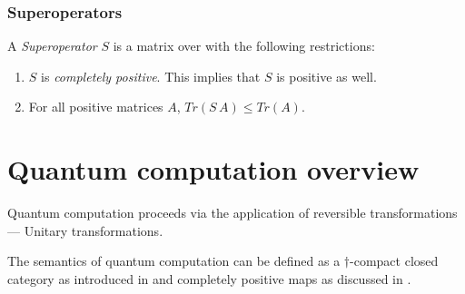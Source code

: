 
\subsubsection{Superoperators} %
\label{ssub:superoperators}

A \emph{Superoperator} $S$ is a matrix over \complex{} with the following restrictions:
\begin{enumerate}
  \item{} $S$ is \emph{completely positive}. This implies that $S$ is positive as well.
  \item{} For all positive matrices $A$, $Tr(S\,A) \leq Tr(A)$.
\end{enumerate}



\section{Quantum computation overview} %
\label{sec:quantum_computation_overview}

Quantum computation proceeds via the application of reversible transformations --- Unitary
transformations.

The semantics of quantum computation can be defined as a $\dagger$-compact closed category as
introduced in \cite{abramsky02:traces,abramsky05:abstracttraces} and completely positive maps as
discussed in \cite{selinger05:dagger}.

